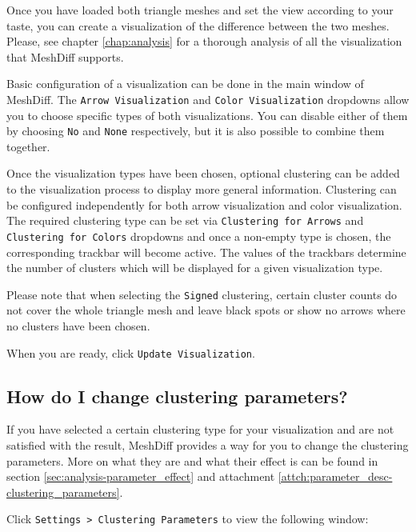 Once you have loaded both triangle meshes and set the view according to your taste, you can create a visualization of the difference between the two meshes. Please, see chapter \ref{chap:analysis} for a thorough analysis of all the visualization that MeshDiff supports.

Basic configuration of a visualization can be done in the main window of MeshDiff. The \verb+Arrow Visualization+ and \verb+Color Visualization+ dropdowns allow you to choose specific types of both visualizations. You can disable either of them by choosing \verb+No+ and \verb+None+ respectively, but it is also possible to combine them together.

Once the visualization types have been chosen, optional clustering can be added to the visualization process to display more general information. Clustering can be configured independently for both arrow visualization and color visualization. The required clustering type can be set via \verb+Clustering for Arrows+ and \verb+Clustering for Colors+ dropdowns and once a non-empty type is chosen, the corresponding trackbar will become active. The values of the trackbars determine the number of clusters which will be displayed for a given visualization type.

Please note that when selecting the \verb+Signed+ clustering, certain cluster counts do not cover the whole triangle mesh and leave black spots or show no arrows where no clusters have been chosen.

When you are ready, click \verb+Update Visualization+.

\subsection{How do I change clustering parameters?}
\label{attch:user_doc-clustering_params}

If you have selected a certain clustering type for your visualization and are not satisfied with the result, MeshDiff provides a way for you to change the clustering parameters. More on what they are and what their effect is can be found in section \ref{sec:analysis-parameter_effect} and attachment \ref{attch:parameter_desc-clustering_parameters}.

Click \verb+Settings > Clustering Parameters+ to view the following window:

